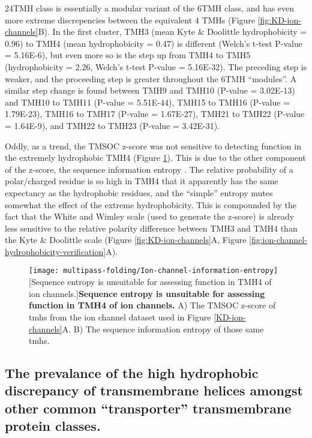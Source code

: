 24TMH class is essentially a modular variant of the 6TMH class, and has even more extreme discrepencies between the equivalent 4 TMHs (Figure \ref{fig:KD-ion-channels}B).
In the first cluster, TMH3 (mean Kyte \& Doolittle hydrophobicity = 0.96) to TMH4 (mean hydrophobicity = 0.47) is different (Welch's t\--test P\--value = 5.16E-6), but even more so is the step up from TMH4 to TMH5 (hydrophobicity = 2.26, Welch's t\--test P\--value = 5.16E-32).
The preceding step is weaker, and the proceeding step is greater throughout the 6TMH ``modules''.
A similar step change is found between TMH9 and TMH10 (P\--value = 3.02E-13) and TMH10 to TMH11 (P\--value = 5.51E-44), TMH15 to TMH16 (P\--value = 1.79E-23), TMH16 to TMH17 (P\--value = 1.67E-27), TMH21 to TMH22 (P\--value = 1.64E-9), and TMH22 to TMH23 (P\--value = 3.42E-31).

Oddly, as a trend, the TMSOC z-score was not sensitive to detecting function in the extremely hydrophobic TMH4 (Figure \ref{fig:Ion-channel-information-entropy}).
This is due to the other component of the z-score, the sequence information entropy \cite{Wong2011, Wong2012}.
The relative probability of a polar/charged residue is so high in TMH4 that it apparently has the same expectancy as the hydrophobic residues, and the ``simple'' entropy mutes somewhat the effect of the extreme hydrophobicity.
This is compounded by the fact that the White and Wimley scale (used to generate the z-score) is already less sensitive to the relative polarity difference between TMH3 and TMH4 than the Kyte \& Doolittle scale (Figure \ref{fig:KD-ion-channels}A, Figure \ref{fig:ion-channel-hydrophobicity-verification}A).

\begin{figure}[!ht]
\centering
\texttt{[image: multipass-folding/Ion-channel-information-entropy]}
		[Sequence entropy is unsuitable for assessing function in TMH4 of ion channels.]{\textbf{Sequence entropy is unsuitable for assessing function in TMH4 of ion channels.}
    A) The TMSOC z-score \cite{Wong2011, Wong2012} of \gls{tmh}s from the ion channel dataset used in Figure \ref{KD-ion-channels}A.
    B) The sequence information entropy of those same \gls{tmh}s.
    }

\label{fig:Ion-channel-information-entropy}
\end{figure}


\subsection{The prevalance of the high hydrophobic discrepancy of transmembrane helices amongst other common ``transporter'' transmembrane protein classes.}

